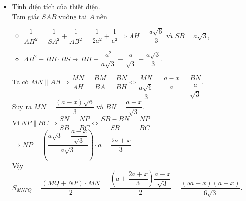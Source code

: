 \begin{bt}
{\begin{itemize}
{\begin{tikzpicture}[scale=1, font=\footnotesize, line join=round, line cap=round,>=stealth]
				\end{tikzpicture}}\noindent
				Do đó, thiết diện cần tìm là hình thang $MNPQ$ (vì $MQ\parallel AD\parallel BC\parallel NP$).\\
				Ta có $AH\perp SB$, $AH\perp BC$ và $SB\cap BC=B$.\\
				Suy ra $AH\perp (SBC)\Rightarrow AH\perp NP$ (vì $NP\subset (SBC)$).\\
				Mặt khác, $MN\parallel AH$ nên $MN\perp NP$.\\
				Vậy $MNPQ$ là hình thang vuông tại $M$ và $N$.
				\item Tính diện tích của thiết diện.\\
				Tam giác $SAB$ vuông tại $A$ nên 
				\begin{itemize}
				\item $\dfrac{1}{AH^2}=\dfrac{1}{SA^2}+\dfrac{1}{AB^2}=\dfrac{1}{2a^2}+\dfrac{1}{a^2} \Rightarrow AH=\dfrac{a\sqrt{6}}{3}$ và $SB=a\sqrt{3}$,
				\item $AB^2=BH\cdot BS \Rightarrow BH=\dfrac{a^2}{a\sqrt{3}}=\dfrac{a}{\sqrt{3}}=\dfrac{a\sqrt{3}}{3}$.
				\end{itemize} 
				Ta có $MN\|AH \Rightarrow \dfrac{MN}{AH}=\dfrac{BM}{BA}=\dfrac{BN}{BH} \Leftrightarrow \dfrac{MN}{\dfrac{a\sqrt{6}}{3}}=\dfrac{a-x}{a}=\dfrac{BN}{\dfrac{a}{\sqrt{3}}}$.\\
				Suy ra $MN=\dfrac{(a-x)\sqrt{6}}{3}$ và $BN=\dfrac{a-x}{\sqrt{3}}$.\\
				Vì $NP\|BC \Rightarrow \dfrac{SN}{SB}=\dfrac{NP}{BC} \Leftrightarrow \dfrac{SB-BN}{SB}=\dfrac{NP}{BC}$\\
				$ \Rightarrow NP=\left(\dfrac{a\sqrt{3}-\dfrac{a-x}{\sqrt{3}}}{a\sqrt{3}}\right)\cdot a=\dfrac{2a+x}{3}$.\\
				Vậy $S_{MNPQ}=\dfrac{(MQ+NP)\cdot MN}{2}=\dfrac{\left(a+\dfrac{2a+x}{3}\right)\dfrac{a-x}{\sqrt{3}}}{2}=\dfrac{(5a+x)(a-x)}{6\sqrt{3}}$.
			\end{itemize}
		}	
	\end{bt}
